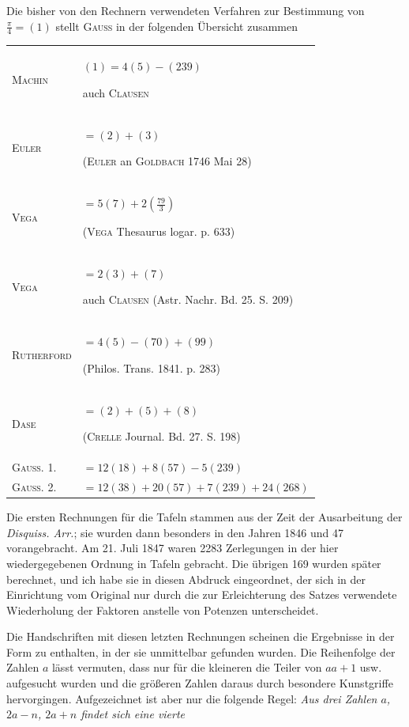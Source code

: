 \par Die bisher von den Rechnern verwendeten Verfahren zur Bestimmung von $\frac{\pi}{4}=(1)$ stellt \textsc{Gauss} in der folgenden Übersicht zusammen
\begingroup\fontsize{10}{13}\selectfont\setlength{\tabcolsep}{3pt}
\begin{longtable}{@{}l p{.74\linewidth}@{}}
\textsc{Machin} & $(1)=4(5)-(239)$\par auch \textsc{Clausen} \\[3pt]
\textsc{Euler} & ${}=(2)+(3)$\par (\textsc{Euler} an \textsc{Goldbach} 1746 Mai 28) \\[3pt]
\textsc{Vega} & ${}=5(7)+2(\frac{79}{3})$\par (\textsc{Vega} Thesaurus logar. p. 633) \\[3pt]
\textsc{Vega} & ${}=2(3)+(7)$\par auch \textsc{Clausen} (Astr. Nachr. Bd. 25. S. 209) \\[3pt]
\textsc{Rutherford} & ${}=4(5)-(70)+(99)$\par (Philos. Trans. 1841. p. 283) \\[3pt]
\textsc{Dase} & ${}=(2)+(5)+(8)$\par (\textsc{Crelle} Journal. Bd. 27. S. 198) \\[3pt]
\textsc{Gauss}. 1. & ${}=12(18)+8(57)-5(239)$ \\[3pt]
\textsc{Gauss}. 2. & ${}=12(38)+20(57)+7(239)+24(268)$ \\[3pt]
\end{longtable}\endgroup
\par Die ersten Rechnungen für die Tafeln stammen aus der Zeit der Ausarbeitung der \textit{Disquiss. Arr.}; sie wurden dann besonders in den Jahren 1846 und 47 vorangebracht. Am 21. Juli 1847 waren 2283 Zerlegungen in der hier wiedergegebenen Ordnung in Tafeln gebracht. Die übrigen 169 wurden später berechnet, und ich habe sie in diesen Abdruck eingeordnet, der sich in der Einrichtung vom Original nur durch die zur Erleichterung des Satzes verwendete Wiederholung der Faktoren anstelle von Potenzen unterscheidet.
\par Die Handschriften mit diesen letzten Rechnungen scheinen die Ergebnisse in der Form zu enthalten, in der sie unmittelbar gefunden wurden. Die Reihenfolge der Zahlen $a$ lässt vermuten, dass nur für die kleineren die Teiler von $aa+1$ usw. aufgesucht wurden und die größeren Zahlen daraus durch besondere Kunstgriffe hervorgingen. Aufgezeichnet ist aber nur die folgende Regel: \textit{Aus drei Zahlen $a$, $2a-n$, $2a+n$ findet sich eine vierte}

